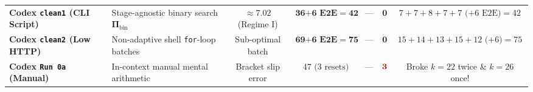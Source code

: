 \documentclass[11pt,a4paper]{article}
\theoremstyle{definition}
\theoremstyle{remark}
\begin{document}
\begin{table}[H]
{\begin{tabular}{@{}llccccc@{}}
\textbf{Codex \texttt{clean1} (CLI Script)} & Stage-agnostic binary search $\bm{\Pi}_{\text{bin}}$ & $\approx 7.02$ (Regime I) & $\mathbf{36\text{+}\text{6 E2E}=42}$ & --- & $\mathbf{0}$ & $7 + 7 + 8 + 7 + 7\text{ (+6 E2E)} = 42$ \\
\textbf{Codex \texttt{clean2} (Low HTTP)} & Non-adaptive shell \texttt{for}-loop batches & Sub-optimal batch & $\mathbf{69\text{+}\text{6 E2E}=75}$ & --- & $\mathbf{0}$ & $15 + 14 + 13 + 15 + 12\text{ (+6)} = 75$ \\
\textbf{Codex \texttt{Run 0a} (Manual)} & In-context manual mental arithmetic & Bracket slip error & $47\text{ (3 resets)}$ & --- & $\textcolor{red!80!black}{\mathbf{3}}$ & Broke $k=22$ twice \& $k=26$ once! \\
\bottomrule
\end{tabular}%
}
\end{table}
\end{document}
